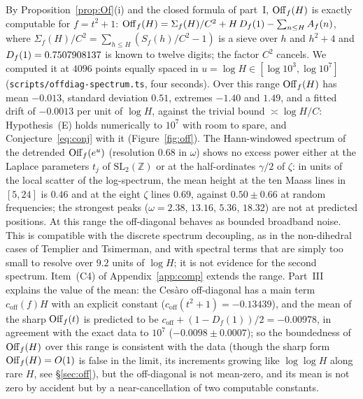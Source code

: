 \documentclass[11pt,a4paper]{article}
\theoremstyle{remark}\newtheorem{remark}[theorem]{Remark}
\newcommand{\Z}{\mathbb{Z}}\newcommand{\Q}{\mathbb{Q}}\newcommand{\F}{\mathbb{F}}\newcommand{\C}{\mathbb{C}}
\begin{document}
By Proposition~\ref{prop:Of}(i) and the closed formula of part~I, $\mathrm{Off}_f(H)$ is exactly computable for
$f=t^2+1$: $\mathrm{Off}_f(H)=\Sigma_f(H)/C^2+H\,D_f(1)-\sum_{n\le H}A_f(n)$, where $\Sigma_f(H)/C^2=\sum_{h\le H}(S_f(h)/C^2-1)$
is a sieve over $h$ and $h^2+4$ and $D_f(1)=0.7507908137$ is known to twelve digits; the factor $C^2$ cancels.
We computed it at $4096$ points equally spaced in $u=\log H\in[\log10^3,\log10^7]$
(\texttt{scripts/offdiag-spectrum.ts}, four seconds). Over this range $\mathrm{Off}_f(H)$ has mean $-0.013$, standard
deviation $0.51$, extremes $-1.40$ and $1.49$, and a fitted drift of $-0.0013$ per unit of $\log H$, against the
trivial bound $\asymp\log H/C$: Hypothesis~(E) holds numerically to $10^7$ with room to spare, and
Conjecture~\eqref{eq:conj} with it (Figure~\ref{fig:off}). The Hann-windowed spectrum of the detrended
$\mathrm{Off}_f(e^u)$ (resolution $0.68$ in $\omega$) shows no excess power either at the Laplace parameters
$t_j$ of $\mathrm{SL}_2(\Z)$ or at the half-ordinates $\gamma/2$ of $\zeta$: in units of the local scatter of
the log-spectrum, the mean height at the ten Maass lines in $[5,24]$ is $0.46$ and at the eight $\zeta$ lines
$0.69$, against $0.50\pm0.66$ at random frequencies; the strongest peaks ($\omega=2.38$, $13.16$, $5.36$,
$18.32$) are not at predicted positions. At this range the off-diagonal behaves as bounded broadband noise. This
is compatible with the discrete spectrum decoupling, as in the non-dihedral cases of Templier and Tsimerman,
and with spectral terms that are simply too small to resolve over $9.2$ units of $\log H$; it is not evidence
for the second spectrum. Item~(C4) of Appendix~\ref{app:comp} extends the range. Part~III explains the value of the mean: the Ces\`aro off-diagonal has a main term $c_{\mathrm{off}}(f)H$ with an
explicit constant ($c_{\mathrm{off}}(t^2+1)=-0.13439$), and the mean of the sharp $\mathrm{Off}_f(t)$ is predicted to be
$c_{\mathrm{off}}+(1-D_f(1))/2=-0.00978$, in agreement with the exact data to $10^7$ ($-0.0098\pm0.0007$); so
the boundedness of $\mathrm{Off}_f(H)$ over this range is consistent with the data (though the sharp form $\mathrm{Off}_f(H)=O(1)$ is
false in the limit, its increments growing like $\log\log H$ along rare $H$, see \S\ref{sec:off}), but the off-diagonal is not mean-zero, and its
mean is not zero by accident but by a near-cancellation of two computable constants.

\end{document}
